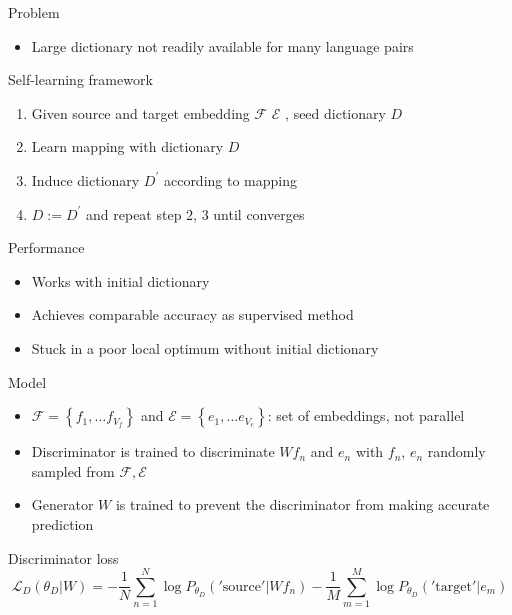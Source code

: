 \documentclass[11pt, a4paper, landscape]{article}
\begin{document}
	\NewPage
	\vfill
	Problem
	\begin{itemize}
		\item Large dictionary not readily available for many language pairs\\
	\end{itemize}
	Self-learning framework \cite{artetxe2017learning}
	\begin{enumerate}
		\item Given source and target embedding ${\mathcal{F}}$ ${\mathcal{E}}$ , seed dictionary $D$
		\item Learn mapping with dictionary $D$
		\item Induce dictionary $D^{\prime}$ according to mapping
		\item ${D:=D^{\prime}}$ and repeat step $2$, $3$ until converges\\
	\end{enumerate}
	
	Performance
	\begin{itemize}
		\item Works with initial dictionary		
		\item Achieves comparable accuracy as supervised method
		\item Stuck in a poor local optimum without initial dictionary
	\end{itemize}
	
	\vfill

	
	
	\NewPage
	\vfill
	Model
	\begin{itemize}
		\item  ${\mathcal{F} = \left\{ f_1, \ldots f_{V_f} \right\} }$ and  ${\mathcal{E} = \left\{ e_1, \ldots e_{V_e} \right\} }$: set of embeddings, not parallel
		\item Discriminator is trained to discriminate ${W{f_n}}$ and ${e_n}$ with ${f_n}$, ${e_n}$ randomly sampled from ${ \mathcal{F},  \mathcal{E} }$ 
		\item Generator ${W}$ is trained to prevent the discriminator from making accurate prediction
		
	\end{itemize}
	
	
	
	Discriminator loss
	\[ \mathcal{L}_D(\theta_D|W) = -\frac{1}{N}\sum_{n=1}^{N}\log P_{\theta_D}('\text{source}'| W f_n) - \frac{1}{M}\sum_{m=1}^{M}\log P_{\theta_D}('\text{target}'| e_m)\]
	
\end{document}
